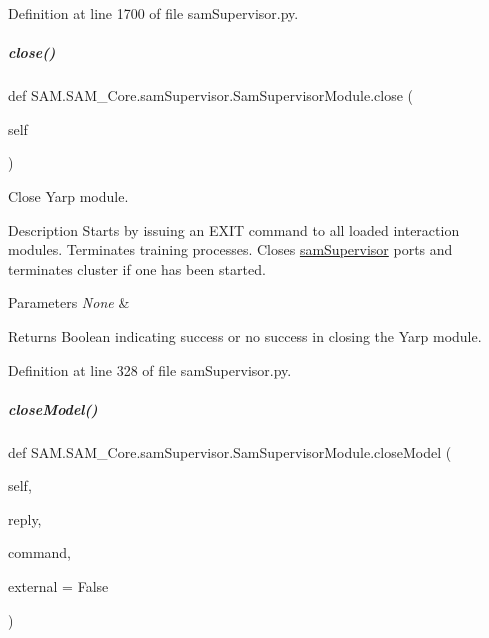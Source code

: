 Definition at line 1700 of file sam\+Supervisor.\+py.

\mbox{\label{group__icubclient__SAM__Core_a6bf831278fec5295fd322c6b8108ad2d}} 
\subparagraph{\texorpdfstring{close()}{close()}}
{\footnotesize\ttfamily def S\+A\+M.\+S\+A\+M\+\_\+\+Core.\+sam\+Supervisor.\+Sam\+Supervisor\+Module.\+close (\begin{DoxyParamCaption}\item[{}]{self }\end{DoxyParamCaption})}



Close Yarp module. 

\begin{DoxyParagraph}{Description}
Starts by issuing an {\ttfamily E\+X\+IT} command to all loaded interaction modules. Terminates training processes. Closes \hyperlink{namespaceSAM_1_1SAM__Core_1_1samSupervisor}{sam\+Supervisor} ports and terminates cluster if one has been started.
\end{DoxyParagraph}

\begin{DoxyParams}{Parameters}
{\em None} & \\
\hline
\end{DoxyParams}
\begin{DoxyReturn}{Returns}
Boolean indicating success or no success in closing the Yarp module. 
\end{DoxyReturn}


Definition at line 328 of file sam\+Supervisor.\+py.

\mbox{\label{group__icubclient__SAM__Core_a17efaa79a4e949060384eb4022e6205a}} 
\subparagraph{\texorpdfstring{close\+Model()}{closeModel()}}
{\footnotesize\ttfamily def S\+A\+M.\+S\+A\+M\+\_\+\+Core.\+sam\+Supervisor.\+Sam\+Supervisor\+Module.\+close\+Model (\begin{DoxyParamCaption}\item[{}]{self,  }\item[{}]{reply,  }\item[{}]{command,  }\item[{}]{external = {\ttfamily False} }\end{DoxyParamCaption})}



